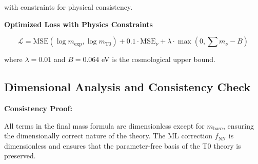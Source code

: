 	with constraints for physical consistency.
	
	\textbf{Optimized Loss with Physics Constraints}
	
	\begin{equation}
		\mathcal{L} = \text{MSE}(\log m_{\exp}, \log m_{\text{T0}}) + 0.1 \cdot \text{MSE}_{\nu} + \lambda \cdot \max(0, \sum m_{\nu} - B)
	\end{equation}
	
	where $\lambda = 0.01$ and $B = 0.064$ eV is the cosmological upper bound.
	
	\subsection{Dimensional Analysis and Consistency Check}
	
	\begin{table}[h]
		\centering
		\caption{Dimensional analysis of the extended T0 parameters}
		\label{tab:dimensions}
	\end{table}
	
	\textbf{Consistency Proof:}
	
	All terms in the final mass formula are dimensionless except for $m_{\text{base}}$, ensuring the dimensionally correct nature of the theory. The ML correction $f_{\text{NN}}$ is dimensionless and ensures that the parameter-free basis of the T0 theory is preserved.
	
